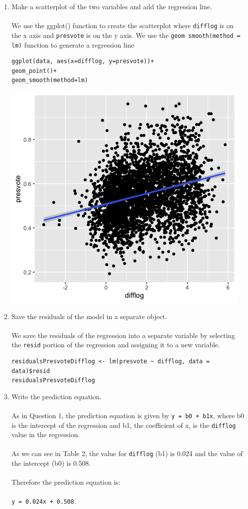 \documentclass[12pt,letterpaper]{article}
\begin{document}
\begin{enumerate}
\newpage
		\item Make a scatterplot of the two variables and add the regression line.
\\\\
\noindent We use the ggplot() function to create the scatterplot where \texttt{difflog} is on the x axis and \texttt{presvote} is on the y axis. We use the \texttt{geom smooth(method = lm)} function to generate a regression line
\begin{lstlisting}
ggplot(data, aes(x=difflog, y=presvote))+
geom_point()+
geom_smooth(method=lm)
\end{lstlisting}
\includegraphics{Scatterplot Difflog Presvote.png}		

\newpage
		\item Save the residuals of the model in a separate object.	
\\\\
\noindent We save the residuals of the regression into a separate variable by selecting the \texttt{resid} portion of the regression and assigning it to a new variable.

\begin{lstlisting}
residualsPresvoteDifflog <- lm(presvote ~ difflog, data = data)$resid
residualsPresvoteDifflog
\end{lstlisting}		

		\item Write the prediction equation.
\\\\
\noindent As in Question 1, the prediction equation is given by \texttt{y = b0 + b1x}, where b0 is the intercept of the regression and b1, the coefficient of x, is the \texttt{difflog} value in the regression.
\\\\
\noindent As we can see in Table 2, the value for \texttt{difflog} (b1) is 0.024 and the value of the intercept (b0) is 0.508.
\\\\
\noindent Therefore the prediction equation is:
\\\\
\noindent \texttt{y = 0.024x + 0.508}.


\end{enumerate}
\end{document}
